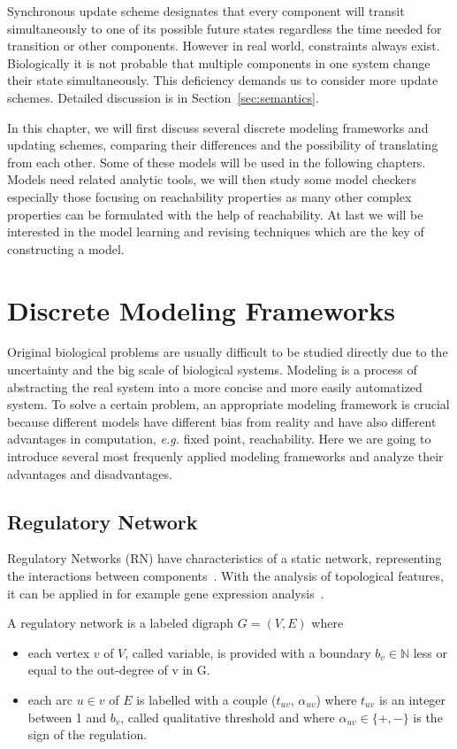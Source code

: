 Synchronous update scheme designates that every component will transit simultaneously to one of its possible future states regardless the time needed for transition or other components.
However in real world, constraints always exist.
Biologically it is not probable that multiple components in one system change their state simultaneously.
This deficiency demands us to consider more update schemes.
Detailed discussion is in Section~\ref{sec:semantics}.

In this chapter, we will first discuss several discrete modeling frameworks and updating schemes, comparing their differences and the possibility of translating from each other.
Some of these models will be used in the following chapters.
Models need related analytic tools, we will then study some model checkers especially those focusing on reachability properties as many other complex properties can be formulated with the help of reachability.
At last we will be interested in the model learning and revising techniques which are the key of constructing a model.

\section{Discrete Modeling Frameworks}
Original biological problems are usually difficult to be studied directly due to the uncertainty and the big scale of biological systems. 
Modeling is a process of abstracting the real system into a more concise and more easily automatized system.
To solve a certain problem, an appropriate modeling framework is crucial because different models have different bias from reality and have also different advantages in computation, \textit{e.g.} fixed point, reachability.
Here we are going to introduce several most frequenly applied modeling frameworks and analyze their advantages and disadvantages.

\subsection{Regulatory Network}\label{sec:regNetwork}
Regulatory Networks (RN) have characteristics of a static network, representing the interactions between components~\cite{bernot2009}.
With the analysis of topological features, it can be applied in for example gene expression analysis~\cite{shinozaki2003regulatory}.

\begin{definition}\label{def:RN}
A regulatory network is a labeled digraph $G=(V,E)$ where 
\begin{itemize}
    \item each vertex $v$ of $V$, called variable, is provided with a boundary $b_v\in \mathbb{N}$ less or equal to the out-degree of v in G.
    \item each arc $u\in v$ of $E$ is labelled with a couple ($t_{uv}$, $\alpha_{uv}$) where $t_{uv}$ is an integer between 1 and $b_v$, called qualitative threshold and where $\alpha_{uv}\in \{+,-\}$ is the sign of the regulation.
\end{itemize}
\end{definition}

